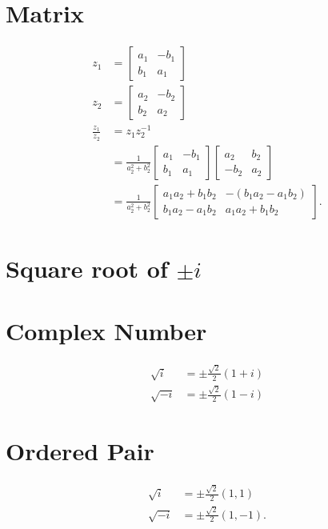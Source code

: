 \documentclass[10pt]{article}
\begin{document}
\section{Matrix}
$$
\begin{aligned}
z_{1} & =\left[\begin{array}{cc}
a_{1} & -b_{1} \\
b_{1} & a_{1}
\end{array}\right] \\
z_{2} & =\left[\begin{array}{cc}
a_{2} & -b_{2} \\
b_{2} & a_{2}
\end{array}\right] \\
\frac{z_{1}}{z_{2}} & =z_{1} z_{2}^{-1} \\
& =\frac{1}{a_{2}^{2}+b_{2}^{2}}\left[\begin{array}{cc}
a_{1} & -b_{1} \\
b_{1} & a_{1}
\end{array}\right]\left[\begin{array}{cc}
a_{2} & b_{2} \\
-b_{2} & a_{2}
\end{array}\right] \\
& =\frac{1}{a_{2}^{2}+b_{2}^{2}}\left[\begin{array}{ll}
a_{1} a_{2}+b_{1} b_{2} & -\left(b_{1} a_{2}-a_{1} b_{2}\right) \\
b_{1} a_{2}-a_{1} b_{2} & a_{1} a_{2}+b_{1} b_{2}
\end{array}\right] .
\end{aligned}
$$

\section{Square root of $\pm i$}
\section{Complex Number}
$$
\begin{aligned}
\sqrt{i} & = \pm \frac{\sqrt{2}}{2}(1+i) \\
\sqrt{-i} & = \pm \frac{\sqrt{2}}{2}(1-i)
\end{aligned}
$$

\section{Ordered Pair}
$$
\begin{aligned}
\sqrt{i} & = \pm \frac{\sqrt{2}}{2}(1,1) \\
\sqrt{-i} & = \pm \frac{\sqrt{2}}{2}(1,-1) .
\end{aligned}
$$
\end{document}
